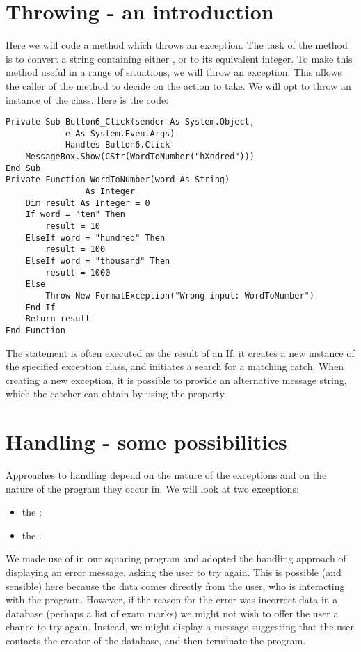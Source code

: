 	\section{Throwing - an introduction}
	Here we will code a method which throws an exception. The task of the method is to convert a string containing either ,  or  to its equivalent integer. To make this method useful in a range of situations, we will throw an exception. This allows the caller of the method to decide on the action to take. We will opt to throw an instance of the  class. Here is the code:
		\begin{lstlisting}
Private Sub Button6_Click(sender As System.Object,
			e As System.EventArgs)
			Handles Button6.Click
	MessageBox.Show(CStr(WordToNumber("hXndred")))
End Sub
Private Function WordToNumber(word As String)
				As Integer
	Dim result As Integer = 0
	If word = "ten" Then
		result = 10
	ElseIf word = "hundred" Then
		result = 100
	ElseIf word = "thousand" Then
		result = 1000
	Else	
		Throw New FormatException("Wrong input: WordToNumber")
	End If
	Return result
End Function
		\end{lstlisting}
		
		The  statement is often executed as the result of an If: it creates a new instance of the specified exception class, and initiates a search for a matching catch. When creating a new exception, it is possible to provide an alternative message string, which the catcher can obtain by using the  property.


	\section{Handling - some possibilities}
		Approaches to handling depend on the nature of the exceptions and on the nature of the program they occur in. We will look at two exceptions:
		\begin{itemize}
      \item the ;
      \item the .
		\end{itemize}
		We made use of  in our squaring program and adopted the handling approach of displaying an error message, asking the user to try again. This is possible (and sensible) here because the data comes directly from the user, who is interacting with the program. However, if the reason for the error was incorrect data in a database (perhaps a list of exam marks) we might not wish to offer the user a chance to try again. Instead, we might display a message suggesting that the user contacts the creator of the database, and then terminate the program.
		
